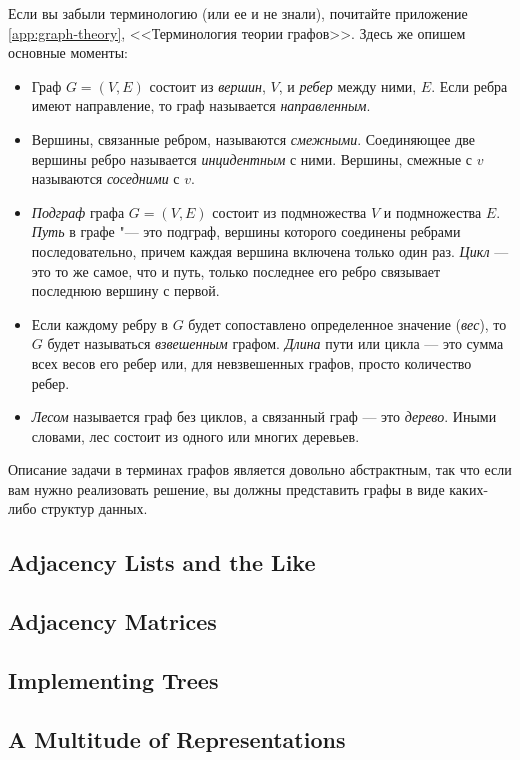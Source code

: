 Если вы забыли терминологию (или ее и не знали), почитайте приложение \ref{app:graph-theory}, <<Терминология теории графов>>. Здесь же опишем основные моменты:
\begin{itemize}
\item Граф $G = (V, E)$ состоит из \textit{вершин}, $V$, и \textit{ребер} между ними, $E$. Если ребра имеют направление, то граф называется \textit{направленным}.
\item Вершины, связанные ребром, называются \textit{смежными}. Соединяющее две вершины ребро называется \textit{инцидентным} с ними. Вершины, смежные с $v$ называются \textit{соседними} с $v$.
\item \textit{Подграф} графа $G = (V,E)$ состоит из подмножества $V$ и подмножества $E$. \textit{Путь} в графе "--- это подграф, вершины которого соединены ребрами последовательно, причем каждая вершина включена только один раз. \textit{Цикл} — это то же самое, что и путь, только последнее его ребро связывает последнюю вершину с первой.
\item Если каждому ребру в $G$ будет сопоставлено определенное значение (\textit{вес}), то $G$ будет называться \textit{взвешенным} графом. \textit{Длина} пути или цикла — это сумма всех весов его ребер или, для невзвешенных графов, просто количество ребер.
\item \textit{Лесом} называется граф без циклов, а связанный граф — это \textit{дерево}. Иными словами, лес состоит из одного или многих деревьев.
\end{itemize}

Описание задачи в терминах графов является довольно абстрактным, так что если вам нужно реализовать решение, вы должны представить графы в виде каких-либо структур данных.


\subsection{Adjacency Lists and the Like}
\subsection{Adjacency Matrices}
\subsection{Implementing Trees}
\subsection{A Multitude of Representations}

